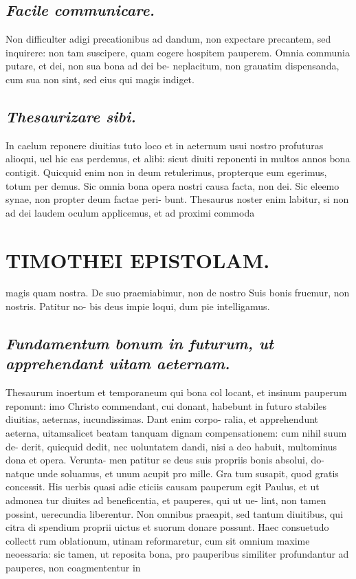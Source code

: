 \documentclass{article}
\begin{document}
\begin{pages}
\subsection*{\textit{Facile communicare. }}\pstart Non difficulter adigi precationibus ad dandum, non expectare precantem, sed inquirere: non tam suscipere, quam cogere hospitem pauperem. Omnia communia putare, et dei, non sua bona ad dei be- neplacitum, non grauatim dispensanda, cum sua non sint, sed eius qui magis indiget.  \pend
{}
{}
\subsection*{\textit{Thesaurizare sibi. }}\pstart In caelum reponere diuitias tuto loco et in aeternum usui nostro profuturas alioqui, uel hic eas perdemus, et alibi: sicut diuiti reponenti in multos annos bona contigit. Quicquid enim non in deum retulerimus, propterque eum egerimus, totum per demus. Sic omnia bona opera nostri causa facta, non dei. Sic eleemo synae, non propter deum factae peri- bunt. Thesaurus noster enim labitur, si non ad dei laudem oculum applicemus, et ad proximi commoda  \pend
\section*{TIMOTHEI EPISTOLAM. }
\marginpar{[ p.185 ]}\pstart magis quam nostra. De suo praemiabimur, non de nostro Suis bonis fruemur, non nostris. Patitur no- bis deus impie loqui, dum pie intelligamus.  \pend
{}
{}
\subsection*{\textit{Fundamentum bonum in futurum, ut apprehendant uitam aeternam. }}\pstart Thesaurum inoertum et temporaneum qui bona col locant, et insinum pauperum reponunt: imo Christo commendant, cui donant, habebunt in futuro stabiles diuitias, aeternas, iucundissimas. Dant enim corpo- ralia, et apprehendunt aeterna, uitamsalicet beatam tanquam dignam compensationem: cum nihil suum de- derit, quicquid dedit, nec uoluntatem dandi, nisi a deo habuit, multominus dona et opera. Verunta- men patitur se deus suis propriis bonis absolui, do- natque unde soluamus, et unum acupit pro mille. Gra tum susapit, quod gratis concessit. His uerbis quasi adie cticiis causam pauperum egit Paulus, et ut admonea tur diuites ad beneficentia, et pauperes, qui ut ue- lint, non tamen possint, uerecundia liberentur. Non omnibus praeapit, sed tantum diuitibus, qui citra di spendium proprii uictus et suorum donare possunt. Haec consuetudo collectt rum oblationum, utinam reformaretur, cum sit omnium maxime neoessaria: sic tamen, ut reposita bona, pro pauperibus similiter profundantur ad pauperes, non coagmententur in  \pend

\end{pages}
\end{document}
